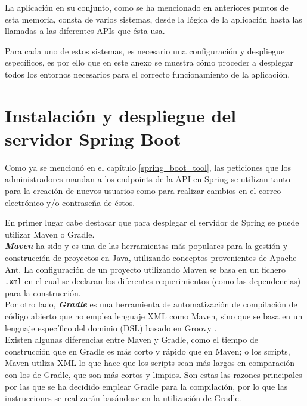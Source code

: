 \setcounter{chapter}{1}
\setcounter{section}{0}

\noindent
La aplicación en su conjunto, como se ha mencionado en anteriores puntos de esta memoria, consta de varios sistemas, desde la lógica de la aplicación hasta las llamadas a las diferentes APIs que ésta usa.

Para cada uno de estos sistemas, es necesario una configuración y despliegue específicos, es por ello que en este anexo se muestra cómo proceder a desplegar todos los entornos necesarios para el correcto funcionamiento de la aplicación.

\section{Instalación y despliegue del servidor Spring Boot}
Como ya se mencionó en el capítulo \ref{spring_boot_tool}, las peticiones que los administradores mandan a los endpoints de la API en Spring se utilizan tanto para la creación de nuevos usuarios como para realizar cambios en el correo electrónico y/o contraseña de éstos.

En primer lugar cabe destacar que para desplegar el servidor de Spring se puede utilizar Maven o Gradle.\\
\textbf{\textit{Maven}} \cite{maven} ha sido y es una de las herramientas más populares para la gestión y construcción de proyectos en Java, utilizando conceptos provenientes de Apache Ant. La configuración de un proyecto utilizando Maven se basa en un fichero \texttt{.xml} en el cual se declaran los diferentes requerimientos (como las dependencias) para la construcción.\\
Por otro lado, \textbf{\textit{Gradle}} \cite{gradle} es una herramienta de automatización de compilación de código abierto que no emplea lenguaje XML como Maven, sino que se basa en un lenguaje específico del dominio (DSL) basado en Groovy \cite{groovy}.\\
Existen algunas diferencias entre Maven y Gradle, como el tiempo de construcción que en Gradle es más corto y rápido que en Maven; o los scripts, Maven utiliza XML lo que hace que los scripts sean más largos en comparación con los de Gradle, que son más cortos y limpios. Son estas las razones principales por las que se ha decidido emplear Gradle para la compilación, por lo que las instrucciones se realizarán basándose en la utilización de Gradle.

